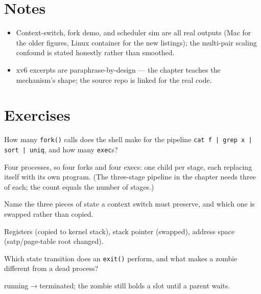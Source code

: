 \section*{Notes}
\label{sec:notes12}
\begin{itemize}
\item Context-switch, fork demo, and scheduler sim are all real
      outputs (Mac for the older figures, Linux container for the
      new listings); the multi-pair scaling confound is
      stated honestly rather than smoothed.
\item xv6 excerpts are paraphrase-by-design --- the chapter teaches
      the mechanism's shape; the source repo is linked for the
      real code.
\end{itemize}

\section*{Exercises}

\begin{exercise}[easy]
How many \texttt{fork()} calls does the shell make for the pipeline
\texttt{cat f | grep x | sort | uniq}, and how many \texttt{exec}s?
\end{exercise}
\begin{solution}[hint]
Four processes, so four forks and four execs: one child per stage,
each replacing itself with its own program. (The three-stage
pipeline in the chapter needs three of each; the count equals the
number of stages.)
\end{solution}

\begin{exercise}[easy]
Name the three pieces of state a context switch must preserve, and
which one is swapped rather than copied.
\end{exercise}
\begin{solution}[hint]
Registers (copied to kernel stack), stack pointer (swapped),
address space (satp/page-table root changed).
\end{solution}

\begin{exercise}[easy]
Which state transition does an \texttt{exit()} perform, and what
makes a zombie different from a dead process?
\end{exercise}
\begin{solution}[hint]
running$\to$terminated; the zombie still holds a slot until a
parent waits.
\end{solution}

